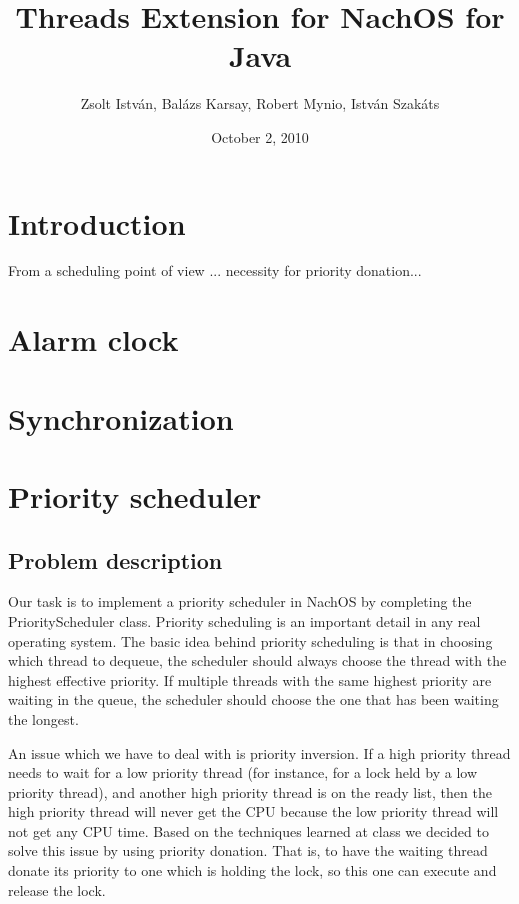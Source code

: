 \documentclass[a4paper,10pt]{article}
\title{Threads Extension for NachOS for Java}
\author{Zsolt Istv\'{a}n, Bal\'{a}zs Karsay, Robert Mynio, Istv\'{a}n Szak\'{a}ts}
\date{October 2, 2010}
\begin{document}
\maketitle

\section{Introduction}

From a scheduling point of view ... necessity for priority donation...

\section{Alarm clock}


\section{Synchronization}


\section{Priority scheduler}

\subsection{Problem description}

Our task is to implement a priority scheduler in NachOS by completing the PriorityScheduler class. Priority scheduling is an important detail in any real operating system. The basic idea behind priority scheduling is that in choosing which thread to dequeue, the scheduler should always choose the thread with the highest effective priority. If multiple threads with the same highest priority are waiting in the queue, the scheduler should choose the one that has been waiting the longest.

An issue which we have to deal with is priority inversion. If a high priority thread needs to wait for a low priority thread (for instance, for a lock held by a low priority thread), and another high priority thread is on the ready list, then the high priority thread will never get the CPU because the low priority thread will not get any CPU time. Based on the techniques learned at class we decided to solve this issue by using priority donation. That is, to have the waiting thread donate its priority to one which is holding the lock, so this one can execute and release the lock.
\end{document}
